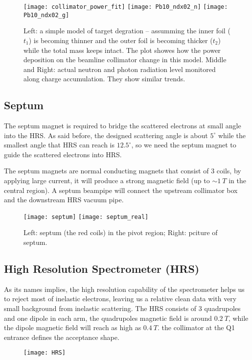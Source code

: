 \begin{figure}[h!]
    \texttt{[image: collimator\_power\_fit]}
    \texttt{[image: Pb10\_ndx02\_n]}
    \texttt{[image: Pb10\_ndx02\_g]}
    \caption{Left: a simple model of target degration -- assumming the inner 
    foil ($t_1$) is becoming thinner and the outer foil is becoming thicker ($t_2$) 
    while the total mass keeps intact. The plot showes how the power deposition 
    on the beamline collimator change in this model. Middle and Right: actual
    neutron and photon radiation level monitored along charge accumulation. They
    show similar trends.}
    \label{fig:collimator_see_target_degration}
\end{figure}


\subsection{Septum}
The septum magnet is required to bridge the scattered electrons at small angle
into the HRS. As said before, the designed scattering angle is about $5^\circ$
while the smallest angle that HRS can reach is $12.5^\circ$, so we need the septum
magnet to guide the scattered electrons into HRS. 

The septum magnets are normal conducting magnets that consist of 3 coils, 
by applying large current, it will produce a
strong magnetic field (up to $\sim 1 \ T$ in the central region). A septum beampipe
will connect the upstream collimator box and the downstream HRS vacuum pipe.

\begin{figure}[h!]
    \texttt{[image: septum]}
    \texttt{[image: septum\_real]}
    \caption{Left: septum (the red coils) in the pivot region; 
    Right: pciture of septum.}
\end{figure}

\subsection{High Resolution Spectrometer (HRS)}
As its names implies, the high resolution capability of the spectrometer helps
us to reject most of inelastic electrons, leaving us a relative clean data with
very small background from inelastic scattering. The HRS consists of 3 quadrupoles 
and one dipole in each arm, the quadrupoles magnetic field is around $0.2 \ T$,
while the dipole magnetic field will reach as high as $0.4 \ T$.
the collimator at the Q1 entrance defines the acceptance shape.
\begin{figure}[h!]
    \centering
    \texttt{[image: HRS]}
\end{figure}

